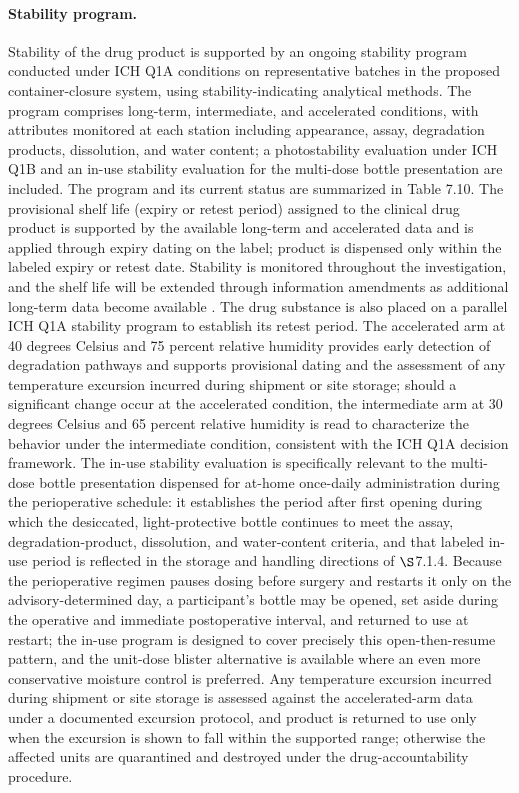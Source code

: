 \paragraph{Stability program.}
Stability of the drug product is supported by an ongoing stability program
conducted under ICH Q1A conditions on representative batches in the proposed
container-closure system, using stability-indicating analytical methods. The
program comprises long-term, intermediate, and accelerated conditions, with
attributes monitored at each station including appearance, assay, degradation
products, dissolution, and water content; a photostability evaluation under ICH
Q1B and an in-use stability evaluation for the multi-dose bottle presentation are
included. The program and its current status are summarized in Table 7.10. The
provisional shelf life (expiry or retest period) assigned to the clinical drug
product is supported by the available long-term and accelerated data and is
applied through expiry dating on the label; product is dispensed only within the
labeled expiry or retest date. Stability is monitored throughout the
investigation, and the shelf life will be extended through information amendments
as additional long-term data become available \cite{phase1guidance}. The drug
substance is also placed on a parallel ICH Q1A stability program to establish its
retest period. The accelerated arm at 40 degrees Celsius and 75 percent relative
humidity provides early detection of degradation pathways and supports provisional
dating and the assessment of any temperature excursion incurred during shipment or
site storage; should a significant change occur at the accelerated condition, the
intermediate arm at 30 degrees Celsius and 65 percent relative humidity is read to
characterize the behavior under the intermediate condition, consistent with the
ICH Q1A decision framework. The in-use stability evaluation is specifically
relevant to the multi-dose bottle presentation dispensed for at-home once-daily
administration during the perioperative schedule: it establishes the period after
first opening during which the desiccated, light-protective bottle continues to
meet the assay, degradation-product, dissolution, and water-content criteria, and
that labeled in-use period is reflected in the storage and handling directions of
$\S$7.1.4. Because the perioperative regimen pauses dosing before surgery and
restarts it only on the advisory-determined day, a participant's bottle may be
opened, set aside during the operative and immediate postoperative interval, and
returned to use at restart; the in-use program is designed to cover precisely this
open-then-resume pattern, and the unit-dose blister alternative is available where
an even more conservative moisture control is preferred. Any temperature excursion
incurred during shipment or site storage is assessed against the accelerated-arm
data under a documented excursion protocol, and product is returned to use only
when the excursion is shown to fall within the supported range; otherwise the
affected units are quarantined and destroyed under the drug-accountability
procedure.

